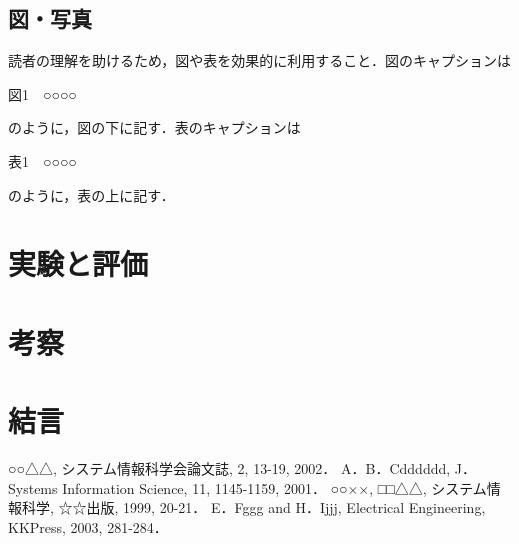 \documentclass[11pt]{ujarticle} %
\begin{document}
\subsection{図・写真}

読者の理解を助けるため，図や表を効果的に利用すること．図のキャプションは

\begin{center}図1　○○○○\end{center}

のように，図の下に記す．表のキャプションは

\begin{center}表1　○○○○\end{center}

のように，表の上に記す．

\section{実験と評価}

\section{考察}

\section{結言}

\begin{thebibliography}{99}
	○○△△, システム情報科学会論文誌, 2, 13-19, 2002．
	A．B．Cdddddd, J． Systems Information Science, 11, 1145-1159, 2001．
	○○××, □□△△, システム情報科学, ☆☆出版, 1999, 20-21．
	E．Fggg and H．Ijjj, Electrical Engineering, KKPress, 2003, 281-284．
\end{thebibliography}
\end{document}
